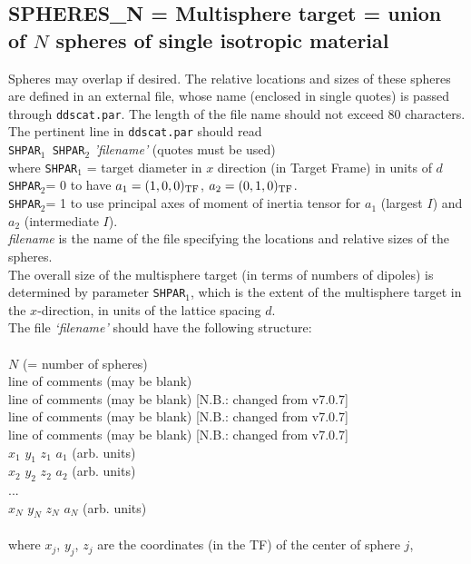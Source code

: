 \subsection{ SPHERES\_N = Multisphere target = union of $N$
	    spheres of single isotropic material
            \label{sec:SPHERES_N}}
	Spheres may overlap if desired.
	The relative locations and sizes of these spheres are
	defined in an external file, whose name (enclosed in single quotes) 
	is passed through {\tt ddscat.par}.  The length of the file name
	should not exceed 80 characters.  
	The pertinent line in {\tt ddscat.par} should read\\
	{\tt SHPAR$_1$ SHPAR$_2$} {\it 'filename'} (quotes must be used)\\
	where {\tt SHPAR$_1$} = target diameter in $x$ direction 
	(in Target Frame) in units of $d$\\
	{\tt SHPAR$_2$}= 0 to have $a_1=(1,0,0)_{\rm TF}$, $a_2=(0,1,0)_{\rm TF}$.\\ 
	{\tt SHPAR$_2$}= 1 to use principal axes of moment of inertia
	tensor for $a_1$ (largest $I$) and $a_2$ (intermediate $I$).\\
	{\it filename} is the name of the file specifying the locations and
	relative sizes of the spheres.\\
	The overall size of the multisphere target (in terms of numbers of
	dipoles) is determined by parameter {\tt SHPAR$_1$}, which is
	the extent of the multisphere target in the $x$-direction, in
	units of the lattice spacing $d$.\\
	The file {\it `filename'} should have the
	following structure:\\ \\
	 $N$ (= number of spheres)\\
	 line of comments (may be blank)\\
	 line of comments (may be blank) [N.B.: changed from v7.0.7]\\
	 line of comments (may be blank) [N.B.: changed from v7.0.7]\\
	 line of comments (may be blank) [N.B.: changed from v7.0.7]\\
	 $x_1$ $y_1$ $z_1$ $a_1$ (arb. units)\\
	 $x_2$ $y_2$ $z_2$ $a_2$ (arb. units)\\
	  ... \\
	 $x_N$ $y_N$ $z_N$ $a_N$ (arb. units)\\ \\
	where $x_j$, $y_j$, $z_j$ are the coordinates (in the TF)
	of the center of sphere $j$,
